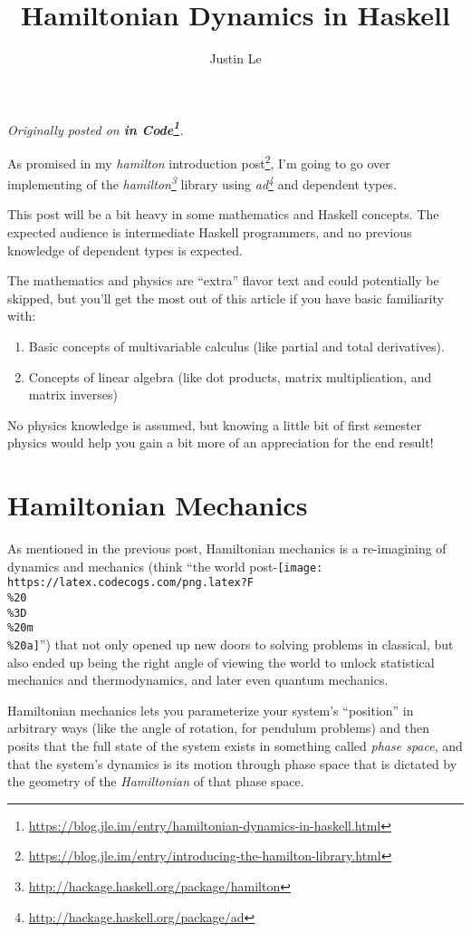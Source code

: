 \documentclass[]{article}
\title{Hamiltonian Dynamics in Haskell}
\author{Justin Le}
\renewcommand{\href}[2]{#2\footnote{\url{#1}}}
\begin{document}
\maketitle

\emph{Originally posted on
\textbf{\href{https://blog.jle.im/entry/hamiltonian-dynamics-in-haskell.html}{in
Code}}.}

As promised in my
\href{https://blog.jle.im/entry/introducing-the-hamilton-library.html}{\emph{hamilton}
introduction post}, I'm going to go over implementing of the
\emph{\href{http://hackage.haskell.org/package/hamilton}{hamilton}} library
using \emph{\href{http://hackage.haskell.org/package/ad}{ad}} and dependent
types.

This post will be a bit heavy in some mathematics and Haskell concepts. The
expected audience is intermediate Haskell programmers, and no previous knowledge
of dependent types is expected.

The mathematics and physics are ``extra'' flavor text and could potentially be
skipped, but you'll get the most out of this article if you have basic
familiarity with:

\begin{enumerate}
\def\labelenumi{\arabic{enumi}.}
\tightlist
\item
  Basic concepts of multivariable calculus (like partial and total derivatives).
\item
  Concepts of linear algebra (like dot products, matrix multiplication, and
  matrix inverses)
\end{enumerate}

No physics knowledge is assumed, but knowing a little bit of first semester
physics would help you gain a bit more of an appreciation for the end result!

\section{Hamiltonian Mechanics}\label{hamiltonian-mechanics}

As mentioned in the previous post, Hamiltonian mechanics is a re-imagining of
dynamics and mechanics (think ``the world
post-\texttt{[image: https://latex.codecogs.com/png.latex?F\\\%20\\\%3D\\\%20m\\\%20a]}'')
that not only opened up new doors to solving problems in classical, but also
ended up being the right angle of viewing the world to unlock statistical
mechanics and thermodynamics, and later even quantum mechanics.

Hamiltonian mechanics lets you parameterize your system's ``position'' in
arbitrary ways (like the angle of rotation, for pendulum problems) and then
posits that the full state of the system exists in something called \emph{phase
space}, and that the system's dynamics is its motion through phase space that is
dictated by the geometry of the \emph{Hamiltonian} of that phase space.
\end{document}
